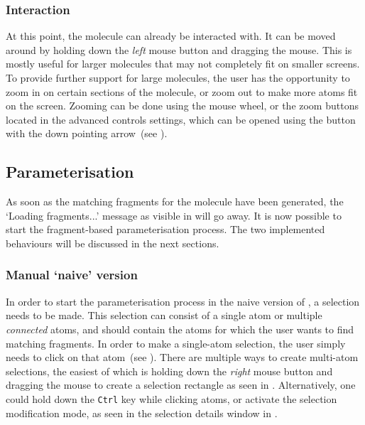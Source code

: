 \subsubsection{Interaction}
At this point, the molecule can already be interacted with. It can be moved around by holding down the \emph{left} mouse button and dragging the mouse. This is mostly useful for larger molecules that may not completely fit on smaller screens. To provide further support for large molecules, the user has the opportunity to zoom in on certain sections of the molecule, or zoom out to make more atoms fit on the screen. Zooming can be done using the mouse wheel, or the zoom buttons located in the advanced controls settings, which can be opened using the button with the down pointing arrow~(see ).


\subsection{Parameterisation}
As soon as the matching fragments for the molecule have been generated, the `Loading fragments...' message as visible in  will go away. It is now possible to start the fragment-based parameterisation process. The two implemented behaviours will be discussed in the next sections.

\subsubsection{Manual `naive' version}
In order to start the parameterisation process in the naive version of \oframp, a selection needs to be made. This selection can consist of a single atom or multiple \emph{connected} atoms, and should contain the atoms for which the user wants to find matching fragments. In order to make a single-atom selection, the user simply needs to click on that atom~(see ). There are multiple ways to create multi-atom selections, the easiest of which is holding down the \emph{right} mouse button and dragging the mouse to create a selection rectangle as seen in . Alternatively, one could hold down the \verb|Ctrl| key while clicking atoms, or activate the selection modification mode, as seen in the selection details window in .

